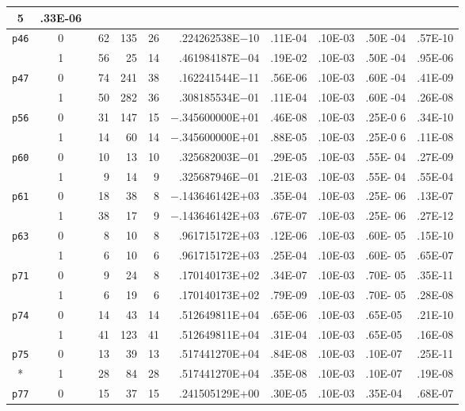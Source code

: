 {\begin{tabular}{cccccrllll}
5&.33E-06\\\hline
 {\tt p46} &0 & ~62  &  135  &26  &   .224262538E$-$10 &.11E-04 & .10E-03 &.50E
-04&.57E-10  \\
           &1 & ~56  &  ~25  &14  &   .461984187E$-$04 &.19E-02 & .10E-03 &.50E
-04&.95E-06\\\hline
 {\tt p47} &0 & ~74  &  241  &38  &   .162241544E$-$11 &.56E-06 & .10E-03 &.60E
-04&.41E-09\\
           &1 & ~50  &  282  & 36 &   .308185534E$-$01 &.11E-04 & .10E-03 &.60E
-04&.26E-08  \\\hline
 {\tt p56} &0 & ~31  & 147   &15  &$-$.345600000E+01 &.46E-08 & .10E-03 &.25E-0
6&.34E-10\\
           &1 & ~14  & ~60   &14  &$-$.345600000E+01 &.88E-05 & .10E-03 &.25E-0
6&.11E-08\\\hline
 {\tt p60} &0 & ~10  &  ~13  &10  &   .325682003E$-$01 &.29E-05 &.10E-03 &.55E-
04&.27E-09\\
           &1 & ~~9  &  ~14  &~9  &   .325687946E$-$01 &.21E-03 &.10E-03 &.55E-
04&.55E-04\\\hline
 {\tt p61} &0 &~18   &  ~38  &~8  &$-$.143646142E+03   &.35E-04 &.10E-03 &.25E-
06&.13E-07\\
           &1 &~38   &  ~17  &~9  &$-$.143646142E+03   &.67E-07 &.10E-03 &.25E-
06&.27E-12\\\hline
 {\tt p63} &0 &~~8   &  ~10  &~8  &   .961715172E+03   &.12E-06 &.10E-03 &.60E-
05&.15E-10\\
           &1 &~~6   &  ~10  &~6  &   .961715172E+03   &.25E-04 &.10E-03 &.60E-
05&.65E-07\\\hline
 {\tt p71} &0 &~~9   &  ~24  &~8  &   .170140173E+02   &.34E-07 &.10E-03 &.70E-
05&.35E-11\\
           &1 &~~6   &  ~19  &~6  &   .170140173E+02   &.79E-09 &.10E-03 &.70E-
05&.28E-08\\\hline
 {\tt p74} &0 &~14   & ~43   &14  &   .512649811E+04 &.65E-06 &.10E-03 &.65E-05
&.21E-10\\
           &1 &~41   & 123   &41  &   .512649811E+04 &.31E-04 &.10E-03 &.65E-05
&.16E-08\\\hline
 {\tt p75} &0 &~13   &  ~39  &13  &   .517441270E+04 &.84E-08 &.10E-03 &.10E-07
&.25E-11\\
*          &1 &~28   &  ~84  &28  &   .517441270E+04 &.35E-08 &.10E-03 &.10E-07
&.19E-08\\\hline
 {\tt p77} &0 &~15   & ~37   &15  &   .241505129E+00 &.30E-05 &.10E-03 &.35E-04
&.68E-07\\

\end{tabular}}
